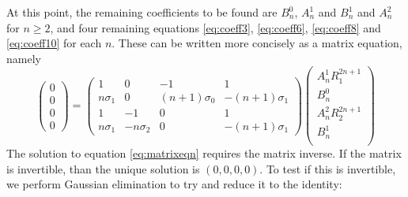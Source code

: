 At this point, the remaining coefficients to be found are $B_n^0$, $A_n^1$ and $B_n^1$ and $A_n^2$ for $n \geq 2$, and four remaining equations \ref{eq:coeff3}, \ref{eq:coeff6}, \ref{eq:coeff8} and \ref{eq:coeff10} for each $n$. These can be written more concisely as a matrix equation, namely
\begin{equation}
    \left(
    \begin{array}{c}
        0 \\
        0 \\
        0 \\
        0
    \end{array}
    \right)
    =
    \left(
    \begin{array}{cccc}
        1          & 0        & -1            & 1              \\
        n\sigma_1  & 0        & (n+1)\sigma_0 & -(n+1)\sigma_1 \\
        1          & -1       & 0             & 1              \\
        n \sigma_1 & -n\sigma_2 & 0             & -(n+1)\sigma_1
    \end{array}
    \right)
    \left(
    \begin{array}{c}
        A_n^1 R_1^{2n+1} \\
        B_n^0            \\
        A_n^2 R_2^{2n+1} \\
        B_n^1            \\
    \end{array}
    \right)
    \label{eq:matrixeqn}
\end{equation}
The solution to equation \ref{eq:matrixeqn} requires the matrix inverse. If the matrix is invertible, than the unique solution is $(0,0,0,0)$. To test if this is invertible, we perform Gaussian elimination to try and reduce it to the identity:
